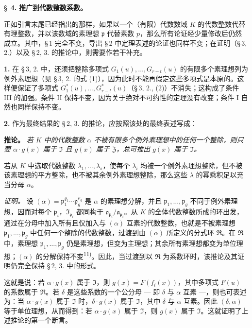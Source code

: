 \bigskip
\S~\textbf{4.}
\textbf{推广到代数整数系数。}

\smallskip

\noindent
正如引言末尾已经指出的那样，如果以一个（有限）代数数域 $K$ 的代数整数代替有理整数，并以该数域的素理想 $\mathfrak{p}$ 代替素数 $p$，那么所有论证经少量修改后仍然成立。其中，\S\,1 完全不变，导出 \S\,2 中定理表述的论证也同样不变；在证明（\S\,3, 2.）以及 \S\,2, 3. 的推论中，则需要作若干补充。

\medskip\noindent\textbf{1.}
在 \S\,3, 2. 中，还须把整除多项式 $G_1(u),\ldots,G_{r-t}(u)$ 的有限多个素理想列为例外素理想（见 \S\,3, 2. 的式 (1)），因为此时不能再假定这些多项式是本原的。这样便保证了多项式 $G^*_1(u),\ldots,G^*_{r-t}(u)$（\S\,3, 2., (2)）不消失；这构成了条件 III 的加强。条件 II 保持不变，因为关于绝对不可约性的定理没有改变；条件 I 自然也同样保持不变。

\medskip\noindent\textbf{2.}
作为最终结果的 \S\,2, 3. 的推论，应按照该处的最终表述写成：

\noindent\textbf{推论。}
\textit{若 $K$ 中的代数整数 $\alpha$ 不被有限多个例外素理想中的任何一个整除，则只要 $\alpha \cdot g(x)$ 属于 $\mathfrak{I}$ 且 $g(x)$ 属于 $\mathfrak{Z}$，总可推出 $g(x)$ 属于 $\mathfrak{I}$。}

若从 $K$ 中选取代数整数 $\lambda_1,\ldots,\lambda_s$，使每个 $\lambda_i$ 均被一个例外素理想整除，但不被该素理想的平方整除，也不被其余例外素理想整除，那么这些 $\lambda$ 的幂乘积足以充当分母 $\alpha$。

\noindent\textit{证明。}
设 $(\alpha) = \mathfrak{p}_1^{\varrho_1} \cdots \mathfrak{p}_g^{\varrho_g}$ 是 $\alpha$ 的素理想分解，并且 $\mathfrak{p}_1,\ldots,\mathfrak{p}_g$ 不同于例外素理想，因而对每个 $\mathfrak{p}_i$，$\mathfrak{I}_{\mathfrak{p}_i}$ 都同构于 $\mathfrak{o}_{\mathfrak{p}_i}/\mathfrak{a}_{\mathfrak{p}_i}$。从 $K$ 的全体代数整数所成的环出发，通过在分母中加入所有且仅加入与 $(\alpha)$ 互素的代数整数，也就是不被素理想 $\mathfrak{p}_1,\ldots,\mathfrak{p}_g$ 中任何一个整除的代数整数，过渡到由 $(\alpha)$ 所定义的分式环 $\mathfrak{R}$。在 $\mathfrak{R}$ 中，素理想 $\mathfrak{p}_1,\ldots,\mathfrak{p}_g$ 仍是素理想，但变为主理想；其余所有素理想都变为单位理想；$(\alpha)$ 的分解保持不变\textsuperscript{11)}。因此，当过渡到以 $\mathfrak{R}$ 为系数环时，该推论及其证明仍完全保持 \S\,2, 3. 中的形式。

这就是说：若 $\alpha \cdot g(x)$ 属于 $\mathfrak{I}$，则 $g(x) = F(f_i(x))$，其中多项式 $F(u)$ 的系数属于 $\mathfrak{R}$。若 $\delta$ 是这些系数的一个公分母 --- 即 $\delta$ 与 $\alpha$ 互素 ---，则也可表述为：当 $\alpha \cdot g(x)$ 属于 $\mathfrak{I}$ 时，$\delta \cdot g(x)$ 属于 $\mathfrak{I}$，其中 $\delta$ 与 $\alpha$ 互素。因此 $(\delta, \alpha)$ 等于单位理想，从而得到：若 $\alpha \cdot g(x)$ 属于 $\mathfrak{I}$，则 $g(x)$ 属于 $\mathfrak{I}$。这就证明了上述推论的第一个断言。

